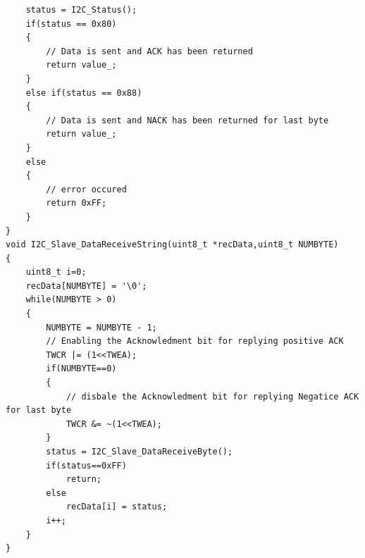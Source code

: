 \documentclass{article}
\begin{document}
\begin{verbatim}
	status = I2C_Status();
	if(status == 0x80)
	{
		// Data is sent and ACK has been returned
		return value_;
	}
	else if(status == 0x88)
	{
		// Data is sent and NACK has been returned for last byte
		return value_;
	}
	else
	{
		// error occured
		return 0xFF;
	}
}
void I2C_Slave_DataReceiveString(uint8_t *recData,uint8_t NUMBYTE)
{
	uint8_t i=0;
	recData[NUMBYTE] = '\0';
	while(NUMBYTE > 0)
	{
		NUMBYTE = NUMBYTE - 1;
		// Enabling the Acknowledment bit for replying positive ACK
		TWCR |= (1<<TWEA);
		if(NUMBYTE==0)
		{
			// disbale the Acknowledment bit for replying Negatice ACK for last byte
			TWCR &= ~(1<<TWEA);
		}
		status = I2C_Slave_DataReceiveByte();
		if(status==0xFF)
			return;
		else		
			recData[i] = status;
		i++;
	}
}
\end{verbatim}
\end{document}
